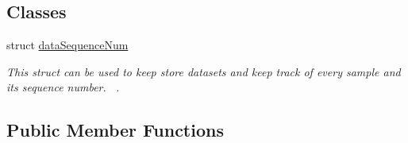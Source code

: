 \subsection*{Classes}
\begin{DoxyCompactItemize}
\item 
struct \hyperlink{struct_ranger_1_1data_sequence_num}{data\+Sequence\+Num}
\begin{DoxyCompactList}\small\item\em This struct can be used to keep store datasets and keep track of every sample and its sequence number.~\newline
. \end{DoxyCompactList}\end{DoxyCompactItemize}
\subsection*{Public Member Functions}
